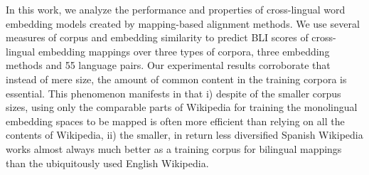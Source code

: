 In this work, we analyze the performance and properties of cross-lingual word embedding models created by mapping-based alignment methods. We use several measures of corpus and embedding similarity to predict BLI scores of cross-lingual embedding mappings over three types of corpora, three embedding methods and 55 language pairs. Our experimental results corroborate that instead of mere size, the amount of common content in the training corpora is essential. This phenomenon manifests in that i) despite of the smaller corpus sizes, using only the comparable parts of Wikipedia for training the monolingual embedding spaces to be mapped is often more efficient than relying on all the contents of Wikipedia, ii) the smaller, in return less diversified Spanish Wikipedia works almost always much better as a training corpus for bilingual mappings than the ubiquitously used English Wikipedia.
